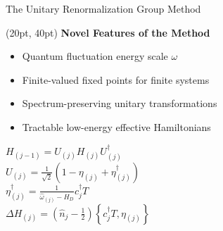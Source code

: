 \documentclass[aspectratio=169]{beamer}
\newcommand{\head}[1]{
\begin{textblock*}{\textwidth}(20pt, 40pt)
\textbf{\Large {#1}}
\end{textblock*}}
\begin{document}
\begin{frame}[noframenumbering]{The Unitary Renormalization Group Method}
\head{Novel Features of the Method}
\begin{minipage}{0.65\textwidth}
\begin{itemize}[<+-|alert@+>]
	\item Quantum fluctuation energy scale \(\omega\)\\[15pt]
	\item Finite-valued fixed points for finite systems\\[15pt]
	\item Spectrum-preserving unitary transformations\\[15pt]
	\item Tractable low-energy effective Hamiltonians
\end{itemize}
\end{minipage}
\begin{minipage}{0.3\textwidth}
\begin{flushleft}
	\(H_{(j-1)} = U_{(j)} H_{(j)} U_{(j)}^\dagger\)\\[15pt]
	\(U_{(j)} = \frac{1}{\sqrt 2}\left(1 - \eta_{(j)} + \eta_{(j)}^\dagger\right) \)\\[15pt]
	\( \eta^\dagger_{(j)} = \frac{1}{\hat \omega_{(j)} - H_D}c^\dagger_j T\)\\[15pt]
	\( \Delta H_{(j)} = \left(\hat n_j - \frac{1}{2}\right) \left\{c^\dagger_j T, \eta_{(j)}\right\} \)
\end{flushleft}
\end{minipage}
\end{frame}
\end{document}
